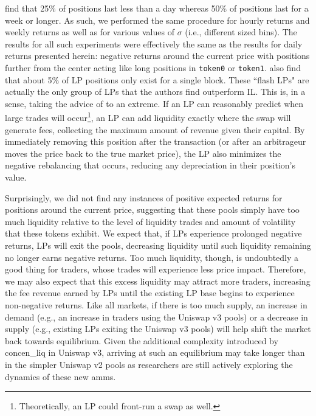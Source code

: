 \documentclass[11pt]{article}
\begin{document}
\citet{loesch2021impermanent} find that 25\% of positions last less than a day whereas 50\% of positions last for a week or longer. As such, we performed the same procedure for hourly returns and weekly returns as well as for various values of $\sigma$ (i.e., different sized bins). The results for all such experiments were effectively the same as the results for daily returns presented herein: negative returns around the current price with positions further from the center acting like long positions in \texttt{token0} or \texttt{token1}. \citet{loesch2021impermanent} also find that about 5\% of LP positions only exist for a single block. These ``flash LPs" are actually the only group of LPs that the authors find outperform IL. This is, in a sense, taking the advice of \citet{LambertMedium2} to an extreme. If an LP can reasonably predict when large trades will occur\footnote{Theoretically, an LP could front-run a swap as well.}, an LP can add liquidity exactly where the swap will generate fees, collecting the maximum amount of revenue given their capital. By immediately removing this position after the transaction (or after an arbitrageur moves the price back to the true market price), the LP also minimizes the negative rebalancing that occurs, reducing any depreciation in their position's value.

Surprisingly, we did not find any instances of positive expected returns for positions around the current price, suggesting that these pools simply have too much liquidity relative to the level of liquidity trades and amount of volatility that these tokens exhibit. We expect that, if LPs experience prolonged negative returns, LPs will exit the pools, decreasing liquidity until such liquidity remaining no longer earns negative returns. Too much liquidity, though, is undoubtedly a good thing for traders, whose trades will experience less price impact. Therefore, we may also expect that this excess liquidity may attract more traders, increasing the fee revenue earned by LPs until the existing LP base begins to experience non-negative returns. Like all markets, if there is too much supply, an increase in demand (e.g., an increase in traders using the Uniswap v3 pools) or a decrease in supply (e.g., existing LPs exiting the Uniswap v3 pools) will help shift the market back towards equilibrium. Given the additional complexity introduced by  \gls{concen_liq} in Uniswap v3, arriving at such an equilibrium may take longer than in the simpler Uniswap v2 pools as researchers are still actively exploring the dynamics of these new \glspl{amm}.
\end{document}
